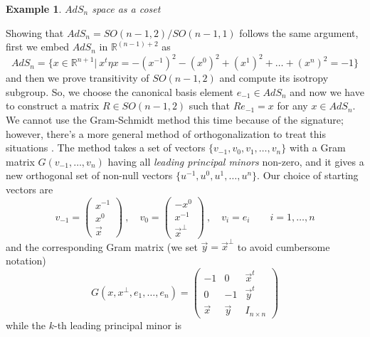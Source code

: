 \documentclass[a4paper,12pt]{article}
\newtheorem{exm}{Example}
\numberwithin{equation}{section}
\numberwithin{thm}{section}
\numberwithin{exm}{section}
\newcommand{\R}{{\mathbb R}}
\newcommand{\<}{{\langle}}
\renewcommand{\>}{{\rangle}}
\begin{document}
\begin{exm}$AdS_n$ space as a coset \end{exm}
Showing that $AdS_n = SO(n-1,2)/SO(n-1,1)$ follows the same argument, first we embed $AdS_n$ in $\R^{(n-1) + 2}$ as
	\begin{equation}
	AdS_n = \{ x\in \R^{n+1} |\ x^t\eta x = -(x^{-1})^2 - (x^0)^2 + (x^1)^2 + \ldots + (x^n)^2 = -1\}
	\end{equation}
and then we prove transitivity of $SO(n-1,2)$ and compute its isotropy subgroup. So, we choose the canonical basis element $e_{-1}\in AdS_n$ and now we have to construct a matrix  $R\in SO(n-1,2)$ such that $Re_{-1} = x$ for any $x\in AdS_n$. We cannot use the Gram-Schmidt method this time because of the signature; however, there's a more general method of orthogonalization to treat this situations \cite{Gohberg2005}. The method takes a set of vectors $\{v_{-1},v_{0},v_1,\ldots,v_n\}$ with a Gram matrix $G(v_{-1},\ldots,v_n)$ having all {\it leading principal minors} non-zero, and it gives a new orthogonal set of non-null vectors $\{u^{-1}, u^0, u^1,\ldots, u^n\}$. Our choice of starting vectors are
	\begin{equation}
	v_{-1} = \left(
		\begin{array}{c}
		x^{-1} \\
		x^0 \\
		\vec{x}
		\end{array}
	\right)\ ,\quad v_0 = \left(
		\begin{array}{c}
		-x^0 \\
		x^{-1} \\
		\vec x^\perp		
		\end{array}
	\right)\ ,\quad v_i = e_i\qquad i=1,\ldots, n
	\end{equation}
and the corresponding Gram matrix (we set $\vec y = \vec x^\perp$ to avoid cumbersome notation)
	\begin{equation}
	G(x, x^{\perp}, e_1, \ldots, e_n) = \left(
		\begin{array}{ccc}
		-1 & 0 & \vec{x}^t \\
		0 & -1 & \vec{y}^t \\
		\vec{x} & \vec{y} & I_{n\times n}
		\end{array}
	\right)
	\end{equation}
while the $k$-th leading principal minor is
\end{document}
